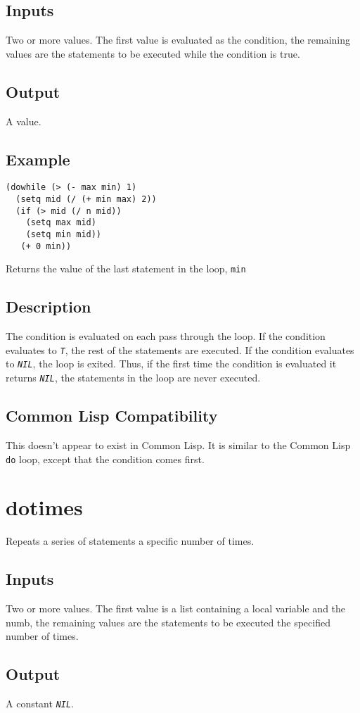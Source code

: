 \documentclass[10pt, openany]{book}
\newcommand{\constant}[1]{\emph{\texttt{#1}}}
\newcommand{\keyword}[1]{\texttt{#1}}
\newcommand{\cl}{Common Lisp}
\begin{document}
\subsection{Inputs}
Two or more values.  The first value is evaluated as the condition, the remaining values are the statements to be executed while the condition is true.
\subsection{Output}
A value.
\subsection{Example}
\begin{lstlisting}
(dowhile (> (- max min) 1)
  (setq mid (/ (+ min max) 2))
  (if (> mid (/ n mid))
    (setq max mid)
    (setq min mid))
   (+ 0 min))
\end{lstlisting}
Returns the value of the last statement in the loop, \keyword{min}
\subsection{Description}
The condition is evaluated on each pass through the loop.  If the condition evaluates to \constant{T}, the rest of the statements are executed.  If the condition evaluates to \constant{NIL}, the loop is exited.  Thus, if the first time the condition is evaluated it returns \constant{NIL}, the statements in the loop are never executed.
\subsection{Common Lisp Compatibility}
This doesn't appear to exist in \cl.  It is similar to the \cl{} \keyword{do} loop, except that the condition comes first.

\section{dotimes}
Repeats a series of statements a specific number of times.
\subsection{Inputs}
Two or more values.  The first value is a list containing a local variable and the numb, the remaining values are the statements to be executed the specified number of times.
\subsection{Output}
A constant \constant{NIL}.
\end{document}
